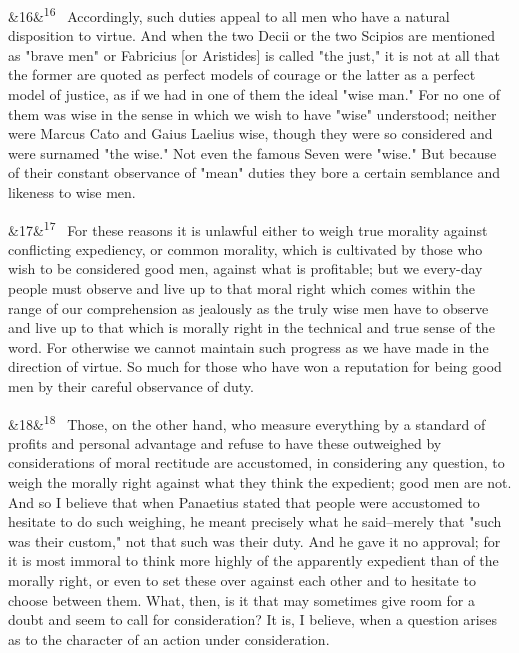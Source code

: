 \documentclass[12pt]{article}
\newcommand{\para}[1][]{\par\noindent\ifx&#1&\else\textsuperscript{\footnotesize #1}~\fi}
\begin{document}
\para[16] Accordingly, such duties appeal to all men who have a natural disposition to virtue. And when the two Decii or the two Scipios are mentioned as "brave men" or Fabricius [or Aristides] is called "the just," it is not at all that the former are quoted as perfect models of courage or the latter as a perfect model of justice, as if we had in one of them the ideal "wise man." For no one of them was wise in the sense in which we wish to have "wise" understood; neither were Marcus Cato and Gaius Laelius wise, though they were so considered and were surnamed "the wise." Not even the famous Seven were "wise." But because of their constant observance of "mean" duties they bore a certain semblance and likeness to wise men.

\para[17] For these reasons it is unlawful either to weigh true morality against conflicting expediency, or common morality, which is cultivated by those who wish to be considered good men, against what is profitable; but we every-day people must observe and live up to that moral right which comes within the range of our comprehension as jealously as the truly wise men have to observe and live up to that which is morally right in the technical and true sense of the word. For otherwise we cannot maintain such progress as we have made in the direction of virtue. So much for those who have won a reputation for being good men by their careful observance of duty.

\para[18] Those, on the other hand, who measure everything by a standard of profits and personal advantage and refuse to have these outweighed by considerations of moral rectitude are accustomed, in considering any question, to weigh the morally right against what they think the expedient; good men are not. And so I believe that when Panaetius stated that people were accustomed to hesitate to do such weighing, he meant precisely what he said--merely that "such was their custom," not that such was their duty. And he gave it no approval; for it is most immoral to think more highly of the apparently expedient than of the morally right, or even to set these over against each other and to hesitate to choose between them. What, then, is it that may sometimes give room for a doubt and seem to call for consideration? It is, I believe, when a question arises as to the character of an action under consideration.
\end{document}
